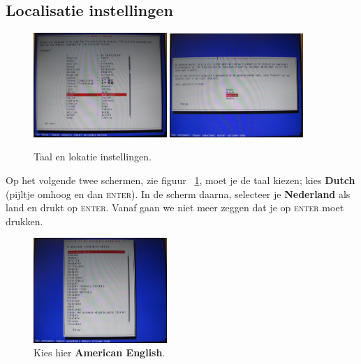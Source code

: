 \documentclass[12pt,a4paper]{article}
\begin{document}
\subsection{Localisatie instellingen}
\begin{figure}[H]
\centering
\includegraphics[width=0.45\textwidth]{taal-keuze-scherm}
\includegraphics[width=0.45\textwidth]{lokatie-keuze-scherm}
\caption{Taal en lokatie instellingen.}
\label{fig:taal-keuze-scherm}
\end{figure}

Op het volgende twee schermen, zie figuur ~\ref{fig:taal-keuze-scherm},  moet je de taal kiezen; kies \textbf{Dutch} (pijltje omhoog en dan \textsc{enter}). In de scherm daarna, selecteer je  \textbf{Nederland} als land en drukt op \textsc{enter}. Vanaf gaan we niet meer zeggen dat je op \textsc{enter} moet drukken.

\begin{figure}[H]
\centering
\includegraphics[width=0.45\textwidth]{toetsenbord-indeling-scherm}
\caption{Kies hier \textbf{American English}.}
\label{fig:toetsenbord-indeling-scherm}
\end{figure}
\end{document}
